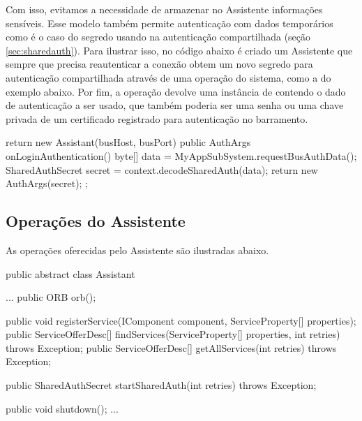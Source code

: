 Com isso, evitamos a necessidade de armazenar no Assistente informações sensíveis.
Esse modelo também permite autenticação com dados temporários como é o caso do segredo usando na autenticação compartilhada (seção \ref{sec:sharedauth}).
Para ilustrar isso, no código abaixo é criado um Assistente que sempre que precisa reautenticar a conexão obtem um novo segredo para autenticação compartilhada através de uma operação do sistema, como a  do exemplo abaixo.
Por fim, a operação  devolve uma instância de  contendo o dado de autenticação a ser usado, que também poderia ser uma senha ou uma chave privada de um certificado registrado para autenticação no barramento.

\begin{samplecode}
return new Assistant(busHost, busPort) {
  public AuthArgs onLoginAuthentication() {
    byte[] data = MyAppSubSystem.requestBusAuthData();
    SharedAuthSecret secret = context.decodeSharedAuth(data);
    return new AuthArgs(secret);
  }
};
\end{samplecode}

\subsection{Operações do Assistente}

As operações oferecidas pelo Assistente são ilustradas abaixo.

\begin{samplecode}
public abstract class Assistant {
  ...
  public ORB orb();

  public void registerService(IComponent component,
                              ServiceProperty[] properties);
  public ServiceOfferDesc[] findServices(ServiceProperty[] properties,
                                         int retries)
                                         throws Exception;
  public ServiceOfferDesc[] getAllServices(int retries)
                                           throws Exception;

  public SharedAuthSecret startSharedAuth(int retries)
                                      throws Exception;

  public void shutdown();
  ...
}
\end{samplecode}

